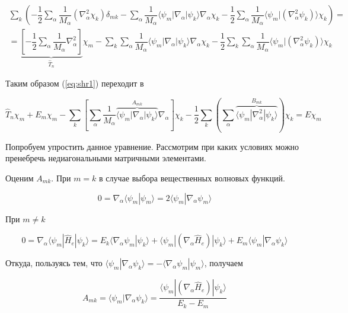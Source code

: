 \documentclass[12pt, oneside]{article}
\numberwithin{equation}{section}  %
\begin{document}
\begin{equation}
\begin{split}
    \sum_k \left(- \dfrac{1}{2} \sum_\alpha \dfrac{1}{M_\alpha} (\nabla_\alpha^2 \chi_k) \delta_{mk} - \sum_\alpha \dfrac{1}{M_\alpha} \langle \psi_m | \nabla_\alpha| \psi_k \rangle \nabla_\alpha \chi_k - \dfrac{1}{2} \sum_\alpha \dfrac{1}{M_\alpha} \langle \psi_m |(\nabla_\alpha^2 \psi_k) \rangle \chi_k \right) =\\
     = \underbrace{\left[- \dfrac{1}{2} \sum_\alpha \dfrac{1}{M_\alpha} \nabla_\alpha^2 \right]}_{\hat{T}_n} \chi_m - \sum_k \sum_\alpha \dfrac{1}{M_\alpha} \langle \psi_m | \nabla_\alpha | \psi_k \rangle \nabla_\alpha \chi_k - \dfrac{1}{2} \sum_k \sum_\alpha \dfrac{1}{M_\alpha} \langle \psi_m |(\nabla_\alpha^2 \psi_k) \rangle \chi_k 
\end{split}
\end{equation}

Таким образом (\ref{eq:shr1}) переходит в 

\begin{equation}
    \hat{T}_n \chi_m + E_m \chi_m - \sum_k \left[\sum_\alpha \dfrac{1}{M_\alpha} \overbrace{\langle \psi_m |\nabla_\alpha | \psi_k \rangle}^{A_{mk}} \nabla_\alpha \right] \chi_k - \dfrac{1}{2} \sum_k \left(\sum_\alpha \overbrace{\langle \psi_m | \nabla^2_\alpha | \psi_k \rangle}^{B_{mk}} \right) \chi_k = E \chi_m 
    \label{eq:shr2}
\end{equation}

Попробуем упростить данное уравнение. Рассмотрим при каких условиях можно пренебречь недиагональными матричными элементами.

Оценим \(A_{mk}\). При \(m = k\) в случае выбора вещественных волновых функций.

\[0 = \nabla_\alpha \langle \psi_m | \psi_m \rangle = 2 \langle \psi_m | \nabla_\alpha \psi_m \rangle\]

При \(m \neq k\)

\[0 = \nabla_\alpha \langle \psi_m | \hat{H}_e| \psi_k \rangle = E_k \langle \nabla_\alpha \psi_m | \psi_k \rangle + \langle \psi_m | (\nabla_\alpha \hat{H}_e) | \psi_k \rangle + E_m \langle \psi_m | \nabla_\alpha \psi_k \rangle \]

Откуда, пользуясь тем, что \(\langle \psi_m | \nabla_\alpha \psi_k \rangle = - \langle \nabla_\alpha \psi_m | \psi_m \rangle\), получаем

\begin{equation}
    A_{mk} = \langle \psi_m | \nabla_\alpha \psi_k \rangle = \dfrac{\langle \psi_m | (\nabla_\alpha \hat{H}_e )| \psi_k \rangle}{E_k - E_m}
    \label{eq:bf}
\end{equation}
\end{document}
